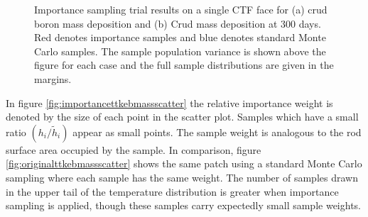 \begin{figure}[H]%
    \centering
    \hspace*{-1.0em}%
    \caption[Importance sampling results.]{Importance sampling trial results on a single CTF face for (a) crud boron mass deposition and (b) Crud mass deposition at 300 days.  Red denotes importance samples and blue denotes standard Monte Carlo samples.  The sample population variance is shown above the figure for each case and the full sample distributions are given in the margins.}%
    \label{fig:imp_sample1}%
\end{figure}

In figure \ref{fig:importancettkebmassscatter} the relative importance weight is denoted by the size of each point in the scatter plot.  Samples which have a small ratio $(h_i/\tilde h_i)$ appear as small points.  The sample weight is analogous to the rod surface area occupied by the sample.  In comparison, figure \ref{fig:originalttkebmassscatter} shows the same patch using a standard Monte Carlo sampling where each sample has the same weight.  The number of samples drawn in the upper tail of the temperature distribution is greater when importance sampling is applied, though these samples carry expectedly small sample weights.

